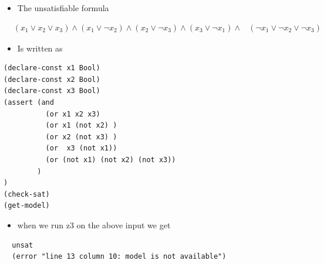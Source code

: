 \documentclass{beamer}
\begin{document}
\begin{frame}[fragile]
  \begin{itemize}
  \item The unsatisfiable formula
  \end{itemize}
\begin{align*}
      &\left(x_1\lor x_2\lor x_3  \right) \land \left(x_1\lor\lnot x_2\right)\land \left( x_2\lor\lnot x_3 \right)\land\left(x_3\lor \lnot x_1\right)      \land &\left(\lnot x_1\lor\lnot x_2\lor\lnot x_3 \right) 
    \end{align*}
    \begin{itemize}
    \item Is written as 
    \end{itemize}
\begin{verbatim}
(declare-const x1 Bool)
(declare-const x2 Bool)
(declare-const x3 Bool)
(assert (and 
          (or x1 x2 x3)
          (or x1 (not x2) )
          (or x2 (not x3) )
          (or  x3 (not x1))
          (or (not x1) (not x2) (not x3))
        )
)
(check-sat)
(get-model)
\end{verbatim}
\end{frame}
\begin{frame}[fragile]

\begin{itemize}
  \item when we run z3 on the above input we get
\end{itemize}
\begin{verbatim}
  unsat
  (error "line 13 column 10: model is not available")
\end{verbatim}
\end{frame}
\end{document}
